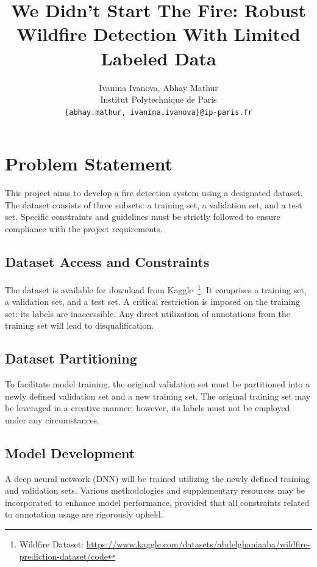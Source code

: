 \documentclass{article}
\title{We Didn't Start The Fire: Robust Wildfire Detection With Limited Labeled Data}
\author{
  Ivanina Ivanova, Abhay Mathur \\
  Institut Polytechnique de Paris \\
  \texttt{\{abhay.mathur, ivanina.ivanova\}@ip-paris.fr} \\
}
\begin{document}
\maketitle

\begin{abstract}
\end{abstract}

\section{Problem Statement}
This project aims to develop a fire detection system using a designated
dataset. The dataset consists of three subsets: a training set, a validation
set, and a test set. Specific constraints and guidelines must be strictly
followed to ensure compliance with the project requirements.

\subsection{Dataset Access and Constraints}

The dataset is available for download from Kaggle~\footnote{Wildfire Dataset:
  \url{https://www.kaggle.com/datasets/abdelghaniaaba/wildfire-prediction-dataset/code}}.
It comprises a training set, a validation set, and a test set. A critical
restriction is imposed on the training set: its labels are inaccessible. Any
direct utilization of annotations from the training set will lead to
disqualification.

\subsection{Dataset Partitioning}

To facilitate model training, the original validation set must be partitioned
into a newly defined validation set and a new training set. The original
training set may be leveraged in a creative manner; however, its labels must
not be employed under any circumstances.

\subsection{Model Development}

A deep neural network (DNN) will be trained utilizing the newly defined
training and validation sets. Various methodologies and supplementary resources
may be incorporated to enhance model performance, provided that all constraints
related to annotation usage are rigorously upheld.
\end{document}
